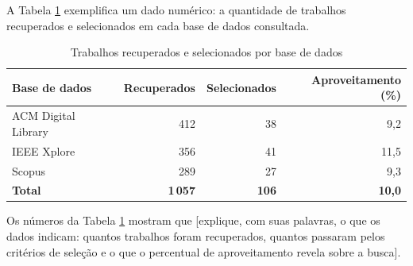 A Tabela \ref{tab:selecao_rsl} exemplifica um dado numérico: a quantidade de trabalhos recuperados e selecionados em cada base de dados consultada.

\begin{table}[htb]
    \centering
    \caption{Trabalhos recuperados e selecionados por base de dados}
    \label{tab:selecao_rsl}
    \begin{tabular}{lrrr}
        \hline
        \textbf{Base de dados} & \textbf{Recuperados} & \textbf{Selecionados} & \textbf{Aproveitamento (\%)} \\
        \hline
        ACM Digital Library & 412 & 38 & 9,2 \\
        IEEE Xplore         & 356 & 41 & 11,5 \\
        Scopus              & 289 & 27 & 9,3 \\
        \textbf{Total}      & \textbf{1\,057} & \textbf{106} & \textbf{10,0} \\
        \hline
    \end{tabular}
\end{table}

Os números da Tabela \ref{tab:selecao_rsl} mostram que [explique, com suas palavras, o que os dados indicam: quantos trabalhos foram recuperados, quantos passaram pelos critérios de seleção e o que o percentual de aproveitamento revela sobre a busca].

%
